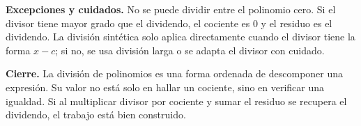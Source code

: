 \documentclass[11pt]{article}
\begin{document}
\textbf{Excepciones y cuidados.} No se puede dividir entre el polinomio cero. Si el divisor tiene mayor grado que el dividendo, el cociente es \(0\) y el residuo es el dividendo. La división sintética solo aplica directamente cuando el divisor tiene la forma \(x-c\); si no, se usa división larga o se adapta el divisor con cuidado.

\textbf{Cierre.} La división de polinomios es una forma ordenada de descomponer una expresión. Su valor no está solo en hallar un cociente, sino en verificar una igualdad. Si al multiplicar divisor por cociente y sumar el residuo se recupera el dividendo, el trabajo está bien construido.
\end{document}
